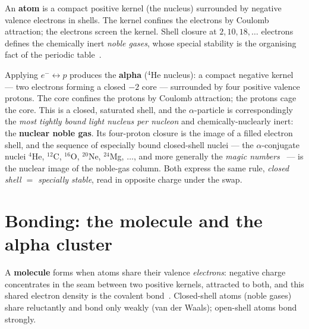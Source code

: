 \documentclass[11pt]{article}
\begin{document}
An \textbf{atom} is a compact positive kernel (the nucleus) surrounded by negative valence electrons
in shells. The kernel confines the electrons by Coulomb attraction; the electrons screen the kernel.
Shell closure at $2,10,18,\dots$ electrons defines the chemically inert \emph{noble gases}, whose
special stability is the organising fact of the periodic table~\cite{MayerJensen}.

Applying $e^-\!\leftrightarrow p$ produces the \textbf{alpha} ($^4$He nucleus): a compact negative
kernel --- two electrons forming a closed $-2$ core --- surrounded by four positive valence protons.
The core confines the protons by Coulomb attraction; the protons cage the core. This is a closed,
saturated shell, and the $\alpha$-particle is correspondingly the \emph{most tightly bound light
nucleus per nucleon} and chemically-nuclearly inert: the \textbf{nuclear noble gas}. Its four-proton
closure is the image of a filled electron shell, and the sequence of especially bound closed-shell
nuclei --- the $\alpha$-conjugate nuclei $^4$He, $^{12}$C, $^{16}$O, $^{20}$Ne, $^{24}$Mg, $\dots$,
and more generally the \emph{magic numbers}~\cite{MayerJensen,HaxelJensenSuess} --- is the nuclear
image of the noble-gas column. Both express the same rule, \emph{closed shell $=$ specially stable},
read in opposite charge under the swap.

\section{Bonding: the molecule and the alpha cluster}

A \textbf{molecule} forms when atoms share their valence \emph{electrons}: negative charge concentrates
in the seam between two positive kernels, attracted to both, and this shared electron density is the
covalent bond~\cite{Johnson-Atoms}. Closed-shell atoms (noble gases) share reluctantly and bond only
weakly (van der Waals); open-shell atoms bond strongly.
\end{document}
